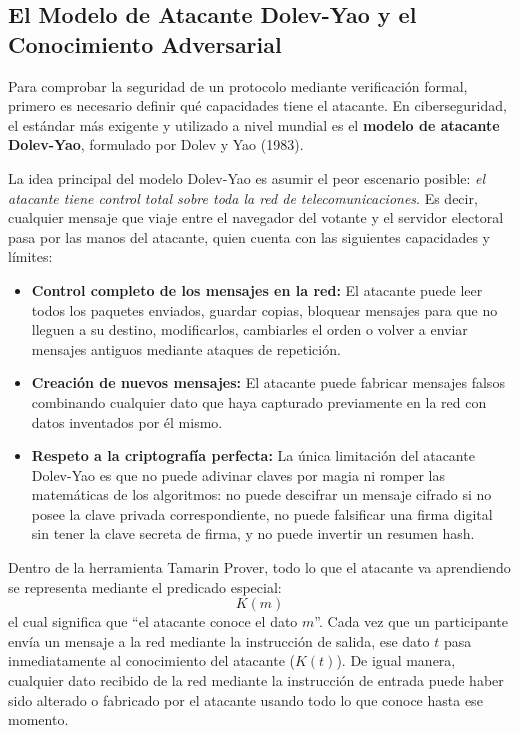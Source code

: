\subsection{El Modelo de Atacante Dolev-Yao y el Conocimiento Adversarial}

Para comprobar la seguridad de un protocolo mediante verificación formal, primero es necesario definir qué capacidades tiene el atacante. En ciberseguridad, el estándar más exigente y utilizado a nivel mundial es el \textbf{modelo de atacante Dolev-Yao}, formulado por Dolev y Yao (1983).

La idea principal del modelo Dolev-Yao es asumir el peor escenario posible: \textit{el atacante tiene control total sobre toda la red de telecomunicaciones}. Es decir, cualquier mensaje que viaje entre el navegador del votante y el servidor electoral pasa por las manos del atacante, quien cuenta con las siguientes capacidades y límites:

\begin{itemize}
	\item \textbf{Control completo de los mensajes en la red:} El atacante puede leer todos los paquetes enviados, guardar copias, bloquear mensajes para que no lleguen a su destino, modificarlos, cambiarles el orden o volver a enviar mensajes antiguos mediante ataques de repetición.

	\item \textbf{Creación de nuevos mensajes:} El atacante puede fabricar mensajes falsos combinando cualquier dato que haya capturado previamente en la red con datos inventados por él mismo.

	\item \textbf{Respeto a la criptografía perfecta:} La única limitación del atacante Dolev-Yao es que no puede adivinar claves por magia ni romper las matemáticas de los algoritmos: no puede descifrar un mensaje cifrado si no posee la clave privada correspondiente, no puede falsificar una firma digital sin tener la clave secreta de firma, y no puede invertir un resumen hash.
\end{itemize}

Dentro de la herramienta Tamarin Prover, todo lo que el atacante va aprendiendo se representa mediante el predicado especial:
\begin{equation}
	K(m)
\end{equation}
el cual significa que ``el atacante conoce el dato $m$''. Cada vez que un participante envía un mensaje a la red mediante la instrucción de salida, ese dato $t$ pasa inmediatamente al conocimiento del atacante ($K(t)$). De igual manera, cualquier dato recibido de la red mediante la instrucción de entrada puede haber sido alterado o fabricado por el atacante usando todo lo que conoce hasta ese momento.

